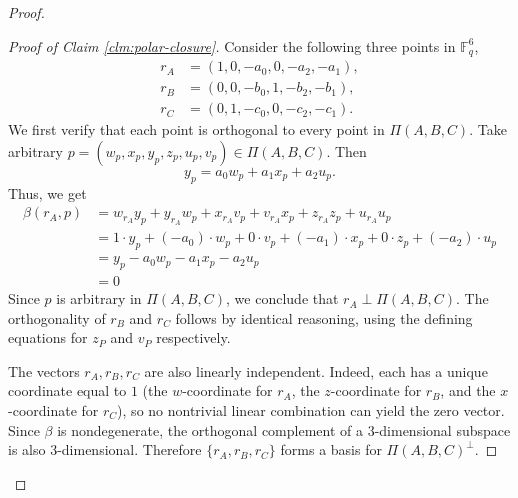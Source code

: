\documentclass[10pt,a4paper]{amsart}
\begin{document}
\begin{proof}
\begin{proof}[Proof of Claim \ref{clm:polar-closure}]
Consider the following three points in $\mathbb{F}_q^6$, 
\[
\begin{aligned}
r_A &= (1, 0, -a_0, 0, -a_2, -a_1), \\
r_B &= (0, 0, -b_0, 1, -b_2, -b_1), \\
r_C &= (0, 1, -c_0, 0, -c_2, -c_1).
\end{aligned}
\]
We first verify that each point is orthogonal to every point in $\Pi(A,B,C)$. Take arbitrary $p = (w_p,x_p,y_p,z_p,u_p,v_p) \in \Pi(A,B,C)$. Then
\[
y_p = a_0 w_p + a_1 x_p + a_2 u_p.
\]
Thus, we get
\begin{align*}
\beta(r_A,p)
&= w_{r_A}y_p + y_{r_A}w_p + x_{r_A}v_p + v_{r_A}x_p + z_{r_A}z_p + u_{r_A}u_p \\
&= 1\cdot y_p + (-a_0)\cdot w_p + 0\cdot v_p + (-a_1)\cdot x_p + 0\cdot z_p + (-a_2)\cdot u_p \\
&= y_p - a_0 w_p - a_1 x_p - a_2 u_p\\
&=0
\end{align*}
Since $p$ is arbitrary in $\Pi(A,B,C)$, we conclude that $r_A \perp \Pi(A,B,C)$. 
The orthogonality of $r_B$ and $r_C$ follows by identical reasoning, using the defining equations for $z_P$ and $v_P$ respectively.

The vectors $r_A, r_B, r_C$ are also linearly independent. Indeed, each has a unique coordinate equal to $1$ (the $w$-coordinate for $r_A$, the $z$-coordinate for $r_B$, and the $x$-coordinate for $r_C$), so no nontrivial linear combination can yield the zero vector. Since $\beta$ is nondegenerate, the orthogonal complement of a $3$-dimensional subspace is also $3$-dimensional. Therefore $\{r_A, r_B, r_C\}$ forms a basis for $\Pi(A,B,C)^\perp$.


\end{proof}
\end{proof}
\end{document}
